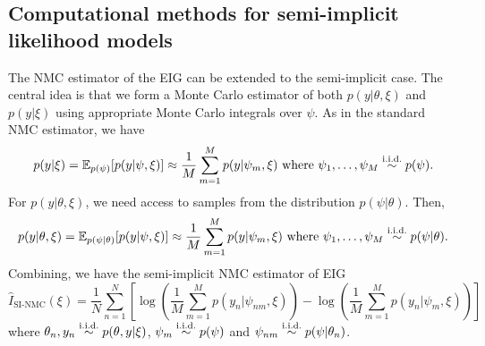 \documentclass[a4paper, 10pt]{report}
\theoremstyle{plain}
\begin{document}
	
	
	
	\subsection{Computational methods for semi-implicit likelihood models}
	
	The NMC estimator of the EIG \citep{ryan2003estimating} can be extended to the semi-implicit case.
	The central idea is that we form a Monte Carlo estimator of both $p(y|\theta,\xi)$ and $p(y|\xi)$ using appropriate Monte Carlo integrals over $\psi$.
	As in the standard NMC estimator, we have
	\begin{equation}
	p(y|\xi)  = \mathbb{E}_{p(\psi)}[p(y|\psi,\xi)] \approx \frac{1}{M} \sum_{m=1}^M p(y|\psi_m,\xi) \text{ where } \psi_1,\dots,\psi_M \overset{\scriptstyle{\text{i.i.d.}}}{\sim} p(\psi).
	\end{equation}
	For $p(y|\theta,\xi)$, we need access to samples from the distribution $p(\psi|\theta)$. Then,
	\begin{equation}
	p(y|\theta,\xi)  = \mathbb{E}_{p(\psi|\theta)}[p(y|\psi,\xi)] \approx \frac{1}{M} \sum_{m=1}^M p(y|\psi_m,\xi) \text{ where } \psi_1,\dots,\psi_M \overset{\scriptstyle{\text{i.i.d.}}}{\sim} p(\psi|\theta).
	\end{equation}
	Combining, we have the semi-implicit NMC estimator of EIG
	\begin{equation}
	\hat{I}_\text{SI-NMC}(\xi) = \frac{1}{N} \sum_{n=1}^N \left[ \log\left( \frac{1}{M} \sum_{m=1}^M p(y_n|\psi_{nm},\xi) \right) - \log \left( \frac{1}{M} \sum_{m=1}^M p(y_n|\psi_m,\xi) \right)\right]
	\end{equation}
	where $\theta_n,y_n \overset{\scriptstyle{\text{i.i.d.}}}{\sim} p(\theta,y|\xi)$, $\psi_m \overset{\scriptstyle{\text{i.i.d.}}}{\sim} p(\psi)$ and $\psi_{nm} \overset{\scriptstyle{\text{i.i.d.}}}{\sim} p(\psi|\theta_n)$.
	
\end{document}
